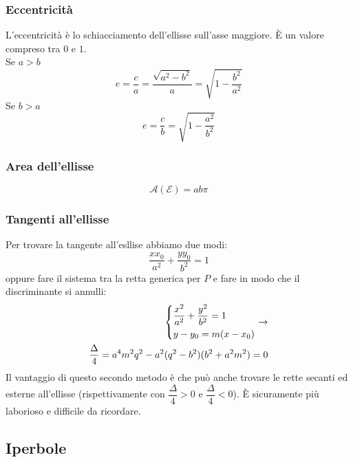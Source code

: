 \subsubsection{Eccentricità}
L'eccentricità è lo schiacciamento dell'ellisse sull'asse maggiore. È un valore compreso tra $0$ e 
$1$.\\
Se $a>b$
\begin{equation*}
  e = \frac{c}{a} = \frac{\sqrt{a^2-b^2}}{a}=\sqrt{1-\frac{b^2}{a^2}}
\end{equation*}
Se $b>a$
\begin{equation*}
  e = \frac{c}{b} = \sqrt{1-\frac{a^2}{b^2}}
\end{equation*}

\subsubsection{Area dell'ellisse}
\begin{equation*}
  \mathscr{A}(\mathscr{E}) = ab\pi
\end{equation*}

\subsubsection{Tangenti all'ellisse}
Per trovare la tangente all'esllise abbiamo due modi:
\begin{equation*}
  \frac{xx_0}{a^2}+\frac{yy_0}{b^2}=1
\end{equation*}
oppure fare il sistema tra la retta generica per $P$ e fare in modo che il discriminante si annulli:
\begin{align*}
  \begin{dcases}
    \frac{x^2}{a^2}+\frac{y^2}{b^2}=1\\
    y-y_0=m(x-x_0)
  \end{dcases}\rightarrow\\ \frac{\Delta}{4}=a^4m^2q^2-a^2(q^2-b^2)(b^2+a^2m^2) = 0
\end{align*}
Il vantaggio di questo secondo metodo è che può anche trovare le rette secanti ed esterne all'ellisse
(rispettivamente con $\dfrac{\Delta}{4}>0$ e $\dfrac{\Delta}{4}<0$). È sicuramente più laborioso e
difficile da ricordare.

\subsection{Iperbole}
\begin{center}
\end{center}

